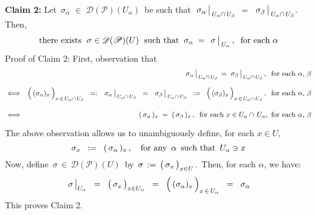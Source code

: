 \vskip 0.5cm
\noindent
\textbf{Claim 2:}\quad
Let
\,$\sigma_{\alpha}$ $\in$ $\mathscr{D}(\mathscr{P})(U_{\alpha})$\,
be such that
\,$\left.\overset{{\color{white}.}}{\sigma_{\alpha}}\,\right\vert_{\,U_{\alpha} \cap\,U_{\beta}}$
$=$
\,$\left.\overset{{\color{white}.}}{\sigma_{\beta}}\,\right\vert_{\,U_{\alpha} \cap\,U_{\beta}}$.
\,\;Then,
\begin{equation*}
\textnormal{there exists \;$\sigma \in \mathscr{D}(\mathscr{P})(U)$\; such that}\;\;
\sigma_{\alpha}
\;=\;
\left.\overset{{\color{white}.}}{\sigma}\,\right\vert_{\,U_{\alpha}},
\;\;\textnormal{for each $\alpha$}
\end{equation*}
\vskip 0.2cm
\noindent
Proof of Claim 2:\quad
First, observation that
\begin{eqnarray*}
&&
	\left.\overset{{\color{white}.}}{\sigma_{\alpha}}\,\right\vert_{\,U_{\alpha}\cap\,U_{\beta}}
	\, = \,
	\left.\overset{{\color{white}.}}{\sigma_{\beta}}\,\right\vert_{\,U_{\alpha}\cap\,U_{\beta}},
	\;\;\textnormal{for each $\alpha$, $\beta$}
\\
& \overset{{\color{white}\textnormal{\LARGE$1$}}}{\Longleftrightarrow} &
	\left(\,\overset{{\color{white}.}}{(\sigma_{\alpha})_{x}}\,\right)_{x \,\in\, U_{\alpha}\cap\,U_{\beta}}
	\;\; =: \;\;
	\left.\overset{{\color{white}.}}{\sigma_{\alpha}}\,\right\vert_{\,U_{\alpha}\cap\,U_{\beta}}
	\;\; = \;\;
	\left.\overset{{\color{white}.}}{\sigma_{\beta}}\,\right\vert_{\,U_{\alpha}\cap\,U_{\beta}}
	\;\; := \;\;
	\left(\,\overset{{\color{white}.}}{(\sigma_{\beta})_{x}}\,\right)_{x \,\in\, U_{\alpha}\cap\,U_{\beta}},
	\;\;\textnormal{for each $\alpha$, $\beta$}
\\
& \overset{{\color{white}\textnormal{\LARGE$1$}}}{\Longleftrightarrow} &
	(\,\sigma_{\alpha}\,)_{x} \; = \; (\,\sigma_{\beta}\,)_{x}\,,
	\;\;\textnormal{for each $x \in U_{\alpha}\cap\,U_{\alpha}$,\, for each $\alpha$, $\beta$}
\end{eqnarray*}
The above observation allows us to unambiguously define, for each $x \in U$,
\begin{equation*}
\sigma_{x}
\;\; := \;\;
	(\,\sigma_{\alpha}\,)_{x}\,,
\quad
\textnormal{for any \,$\alpha$\, such that \,$U_{\alpha} \ni x$}
\end{equation*}
Now, define
\,$\sigma \,\in\, \mathscr{D}(\mathscr{P})(U)$\,
by
\,$\sigma \,:=\, \left(\,\overset{{\color{white}.}}{\sigma_{x}}\,\right)_{x \in U}$.\,
Then, for each $\alpha$, we have:
\begin{equation*}
\left.\overset{{\color{white}\textnormal{\Large$.$}}}{\sigma}\,\right\vert_{U_{\alpha}}
\;\; = \;\;
\left(\,\overset{{\color{white}.}}{\sigma_{x}}\,\right)_{x \in U_{\alpha}}
\;\; = \;\;
\left(\,\overset{{\color{white}.}}{(\sigma_{\alpha})_{x}}\,\right)_{x \,\in\, U_{\alpha}}
\;\; = \;\;
\sigma_{\alpha}
\end{equation*}
This proves Claim 2.

